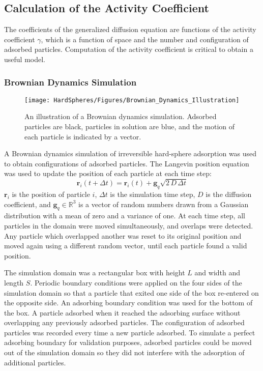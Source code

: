 \subsection{Calculation of the Activity Coefficient}

The coefficients of the generalized diffusion equation are functions
of the activity coefficient $\gamma$, which is a function of space
and the number and configuration of adsorbed particles. Computation
of the activity coefficient is critical to obtain a useful model. 


\subsubsection{Brownian Dynamics Simulation}

%
\begin{figure}
\texttt{[image: HardSpheres/Figures/Brownian\_Dynamics\_Illustration]}

\caption{\label{fig:Brownian Dynamics}An illustration of a Brownian dynamics
simulation. Adsorbed particles are black, particles in solution are
blue, and the motion of each particle is indicated by a vector.}


%
\end{figure}
A Brownian dynamics simulation of irreversible hard-sphere adsorption
was used to obtain configurations of adsorbed particles. The Langevin
position equation \cite{Elimelech1998} was used to update the position
of each particle at each time step: \begin{equation}
\mathbf{r}_{i}(t+\Delta t)=\mathbf{r}_{i}(t)+\mathbf{g}_{q}\sqrt{2\, D\,\Delta t}\label{eq:Langevin equation}\end{equation}
$\mathbf{r}_{i}$ is the position of particle $i$, $\Delta t$ is
the simulation time step, $D$ is the diffusion coefficient, and $\mathbf{g}_{q}\in\mathbb{R}^{3}$
is a vector of random numbers drawn from a Gaussian distribution with
a mean of zero and a variance of one. At each time step, all particles
in the domain were moved simultaneously, and overlaps were detected.
Any particle which overlapped another was reset to its original position
and moved again using a different random vector, until each particle
found a valid position. 

The simulation domain was a rectangular box with height $L$ and width
and length $S$. Periodic boundary conditions were applied on the
four sides of the simulation domain so that a particle that exited
one side of the box re-entered on the opposite side. An adsorbing
boundary condition was used for the bottom of the box. A particle
adsorbed when it reached the adsorbing surface without overlapping
any previously adsorbed particles. The configuration of adsorbed particles
was recorded every time a new particle adsorbed. To simulate a perfect
adsorbing boundary for validation purposes, adsorbed particles could
be moved out of the simulation domain so they did not interfere with
the adsorption of additional particles. 

